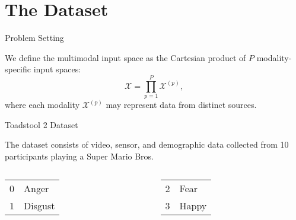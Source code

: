 \section{The Dataset}

\begin{frame}{Problem Setting}
	\begin{block}{}
		We define the multimodal input space as the Cartesian product of $P$ modality-specific input spaces:
		\[
		\mathcal{X} = \prod_{p=1}^{P} \mathcal{X}^{(p)},
		\]
		where each modality $\mathcal{X}^{(p)}$ may represent data from distinct sources.
	\end{block}
	
\end{frame}



\begin{frame}{Toadstool 2 Dataset}
\begin{block}{}
The dataset consists of video, sensor, and demographic data collected from 10 participants playing a Super Mario Bros.
\end{block}

\vspace{-0.5em}

		\begin{columns}[T] %
		\begin{column}{0.5\textwidth}
			\begin{center}

  \begin{columns}[t]
	\centering\footnotesize
	\begin{tabular}{r l}
		0 & Anger   \\
		1 & Disgust
	\end{tabular}
	
	\centering\footnotesize
	\begin{tabular}{r l}
		2 & Fear    \\
		3 & Happy
	\end{tabular}
	

\end{columns}
\end{center}
\end{column}
\end{columns}
\end{frame}
